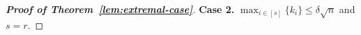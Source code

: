 \documentclass[11pt, a4paper]{article}
\theoremstyle{definition}
\newcommand{\<}{\subseteq}
\newcommand{\de}{\delta}
\begin{document}
\begin{proof}[{\bf Proof of Theorem~\ref{lem:extremal-case}}]

\medskip
{\bf Case 2.} 
$\max_{i\in [s]}\{k_i\}\leq \de \sqrt{n}$ and $s=r$.
\medskip


\end{proof}
\end{document}
